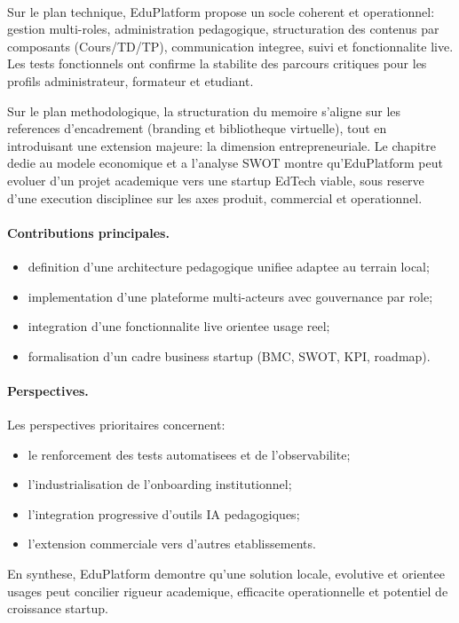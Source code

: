 ﻿﻿\documentclass[12pt,a4paper,oneside]{report}
\begin{document}
Sur le plan technique, EduPlatform propose un socle coherent et operationnel: gestion multi-roles, administration pedagogique, structuration des contenus par composants (Cours/TD/TP), communication integree, suivi et fonctionnalite live. Les tests fonctionnels ont confirme la stabilite des parcours critiques pour les profils administrateur, formateur et etudiant.

Sur le plan methodologique, la structuration du memoire s'aligne sur les references d'encadrement (branding et bibliotheque virtuelle), tout en introduisant une extension majeure: la dimension entrepreneuriale. Le chapitre dedie au modele economique et a l'analyse SWOT montre qu'EduPlatform peut evoluer d'un projet academique vers une startup EdTech viable, sous reserve d'une execution disciplinee sur les axes produit, commercial et operationnel.

\paragraph{Contributions principales.}
\begin{itemize}
  \item definition d'une architecture pedagogique unifiee adaptee au terrain local;
  \item implementation d'une plateforme multi-acteurs avec gouvernance par role;
  \item integration d'une fonctionnalite live orientee usage reel;
  \item formalisation d'un cadre business startup (BMC, SWOT, KPI, roadmap).
\end{itemize}

\paragraph{Perspectives.}
Les perspectives prioritaires concernent:
\begin{itemize}
  \item le renforcement des tests automatisees et de l'observabilite;
  \item l'industrialisation de l'onboarding institutionnel;
  \item l'integration progressive d'outils IA pedagogiques;
  \item l'extension commerciale vers d'autres etablissements.
\end{itemize}

En synthese, EduPlatform demontre qu'une solution locale, evolutive et orientee usages peut concilier rigueur academique, efficacite operationnelle et potentiel de croissance startup.


\clearpage
\printbibliography[title={Bibliographie}, heading=bibintoc]
\end{document}
